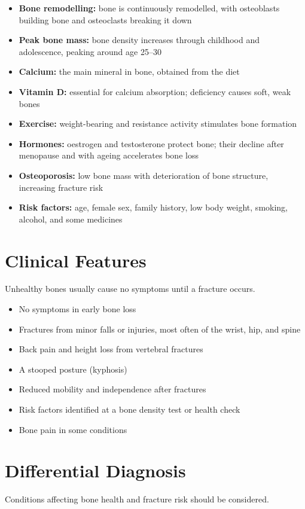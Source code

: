 \begin{itemize}
    \item \textbf{Bone remodelling:} bone is continuously remodelled, with osteoblasts building bone and osteoclasts breaking it down
    \item \textbf{Peak bone mass:} bone density increases through childhood and adolescence, peaking around age 25--30
    \item \textbf{Calcium:} the main mineral in bone, obtained from the diet
    \item \textbf{Vitamin D:} essential for calcium absorption; deficiency causes soft, weak bones
    \item \textbf{Exercise:} weight-bearing and resistance activity stimulates bone formation
    \item \textbf{Hormones:} oestrogen and testosterone protect bone; their decline after menopause and with ageing accelerates bone loss
    \item \textbf{Osteoporosis:} low bone mass with deterioration of bone structure, increasing fracture risk
    \item \textbf{Risk factors:} age, female sex, family history, low body weight, smoking, alcohol, and some medicines
\end{itemize}

\section*{Clinical Features}
Unhealthy bones usually cause no symptoms until a fracture occurs.

\begin{itemize}
    \item No symptoms in early bone loss
    \item Fractures from minor falls or injuries, most often of the wrist, hip, and spine
    \item Back pain and height loss from vertebral fractures
    \item A stooped posture (kyphosis)
    \item Reduced mobility and independence after fractures
    \item Risk factors identified at a bone density test or health check
    \item Bone pain in some conditions
\end{itemize}

\section*{Differential Diagnosis}
Conditions affecting bone health and fracture risk should be considered.

